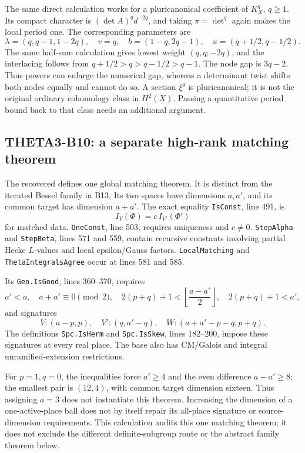 \documentclass[11pt]{article}
\theoremstyle{definition}\newtheorem{definition}[theorem]{Definition}\newtheorem{remark}[theorem]{Remark}
\begin{document}
The same direct calculation works for a pluricanonical coefficient of $K_X^q$, $q\geq1$. Its compact character is $(\det A)^qd^{-2q}$, and taking $\pi=\det^q$ again makes the local period one. The corresponding parameters are
\[
 \lambda=(q,q-1,1-2q),\quad v=q,\quad
 b=(1-q,2q-1),\quad u=(q+1/2,q-1/2).
\]
The same half-sum calculation gives lowest weight $(q,q;-2q)$, and the interlacing follows from
$q+1/2>q>q-1/2>q-1$. The node gap is $3q-2$. Thus powers can enlarge the numerical gap, whereas a determinant twist shifts both nodes equally and cannot do so. A section $\xi^q$ is pluricanonical; it is not the original ordinary cohomology class in $H^2(X)$. Passing a quantitative period bound back to that class needs an additional argument.

\subsection{THETA3-B10: a separate high-rank matching theorem}\label{B10}

The recovered  defines one global matching theorem. It is distinct from the iterated Bessel family in B13. Its two spaces have dimensions $a,a'$, and its common target has dimension $a+a'$. The exact equality \texttt{IsConst}, line 491, is
\[
 I_V(\Phi)=c\,I_{V'}(\Phi')
\]
for matched data. \texttt{OneConst}, line 503, requires uniqueness and $c\ne0$. \texttt{StepAlpha} and \texttt{StepBeta}, lines 571 and 559, contain recursive constants involving partial Hecke $L$-values and local epsilon/Gauss factors. \texttt{LocalMatching} and \texttt{ThetaIntegralsAgree} occur at lines 581 and 585.

Its \texttt{Geo.IsGood}, lines 360--370, requires
\[
 a'<a,\quad a+a'\equiv0\pmod2,\quad
 2(p+q)+1<\left\lfloor\frac{a-a'}2\right\rfloor,\quad
 2(p+q)+1<a',
\]
and signatures
\[
 V:(a-p,p),\quad V':(q,a'-q),\quad
 W:(a+a'-p-q,p+q).
\]
The definitions \texttt{Spc.IsHerm} and \texttt{Spc.IsSkew}, lines 182--200, impose these signatures at every real place. The base also has CM/Galois and integral unramified-extension restrictions.

For $p=1,q=0$, the inequalities force $a'\geq4$ and the even difference $a-a'\geq8$; the smallest pair is $(12,4)$, with common target dimension sixteen. Thus assigning $a=3$ does not instantiate this theorem. Increasing the dimension of a one-active-place ball does not by itself repair its all-place signature or source-dimension requirements. This calculation audits this one matching theorem; it does not exclude the different definite-subgroup route or the abstract family theorem below.
\end{document}
